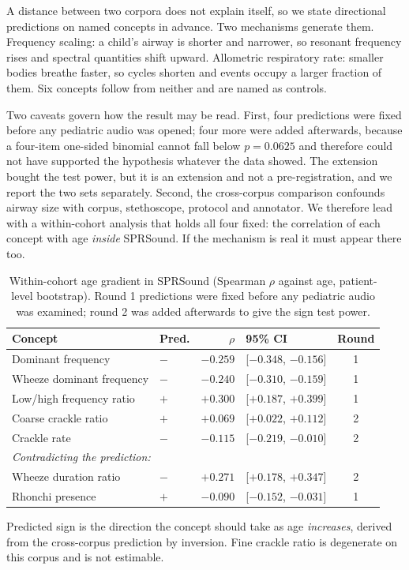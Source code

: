 \documentclass[journal,onecolumn]{IEEEtran}
\begin{document}
A distance between two corpora does not explain itself, so we state directional
predictions on named concepts in advance. Two mechanisms generate them. Frequency
scaling: a child's airway is shorter and narrower, so resonant frequency rises and
spectral quantities shift upward. Allometric respiratory rate: smaller bodies breathe
faster, so cycles shorten and events occupy a larger fraction of them. Six concepts
follow from neither and are named as controls.

Two caveats govern how the result may be read. First, four predictions were fixed
before any pediatric audio was opened; four more were added afterwards, because a
four-item one-sided binomial cannot fall below $p=0.0625$ and therefore could not have
supported the hypothesis whatever the data showed. The extension bought the test power,
but it is an extension and not a pre-registration, and we report the two sets
separately. Second, the cross-corpus comparison confounds airway size with corpus,
stethoscope, protocol and annotator. We therefore lead with a within-cohort analysis
that holds all four fixed: the correlation of each concept with age \emph{inside}
SPRSound. If the mechanism is real it must appear there too.

\begin{table}[!t]
\centering
\caption{Within-cohort age gradient in SPRSound (Spearman $\rho$ against age,
patient-level bootstrap). Round 1 predictions were fixed before any pediatric audio
was examined; round 2 was added afterwards to give the sign test power.}
\label{tab:pediatric}
\begin{tabular}{llrlc}
\toprule
Concept & Pred. & $\rho$ & 95\% CI & Round \\
\midrule
Dominant frequency        & $-$ & $-0.259$ & [$-0.348$, $-0.156$] & 1 \\
Wheeze dominant frequency & $-$ & $-0.240$ & [$-0.310$, $-0.159$] & 1 \\
Low/high frequency ratio  & $+$ & $+0.300$ & [$+0.187$, $+0.399$] & 1 \\
Coarse crackle ratio      & $+$ & $+0.069$ & [$+0.022$, $+0.112$] & 2 \\
Crackle rate              & $-$ & $-0.115$ & [$-0.219$, $-0.010$] & 2 \\
\midrule
\multicolumn{5}{l}{\emph{Contradicting the prediction:}} \\
Wheeze duration ratio     & $-$ & $+0.271$ & [$+0.178$, $+0.347$] & 2 \\
Rhonchi presence          & $+$ & $-0.090$ & [$-0.152$, $-0.031$] & 1 \\
\bottomrule
\end{tabular}

\vspace{2pt}
\footnotesize Predicted sign is the direction the concept should take as age
\emph{increases}, derived from the cross-corpus prediction by inversion. Fine crackle
ratio is degenerate on this corpus and is not estimable.
\end{table}
\end{document}
